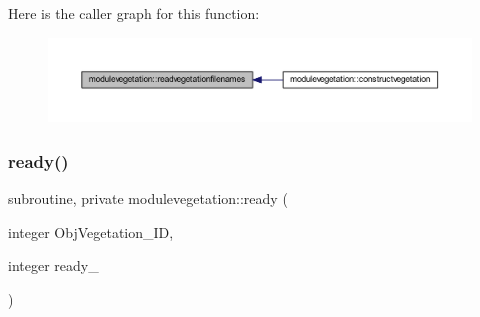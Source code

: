 Here is the caller graph for this function\+:\nopagebreak
\begin{figure}[H]
\begin{center}
\leavevmode
\includegraphics[width=350pt]{namespacemodulevegetation_a8edd281bd5f3e5d91a3fea4575a31396_icgraph}
\end{center}
\end{figure}
\mbox{\label{namespacemodulevegetation_a7bff2743f33908bdf727831d101dc37a}} 
\subsubsection{\texorpdfstring{ready()}{ready()}}
{\footnotesize\ttfamily subroutine, private modulevegetation\+::ready (\begin{DoxyParamCaption}\item[{integer}]{Obj\+Vegetation\+\_\+\+ID,  }\item[{integer}]{ready\+\_\+ }\end{DoxyParamCaption})\hspace{0.3cm}{\ttfamily [private]}}

